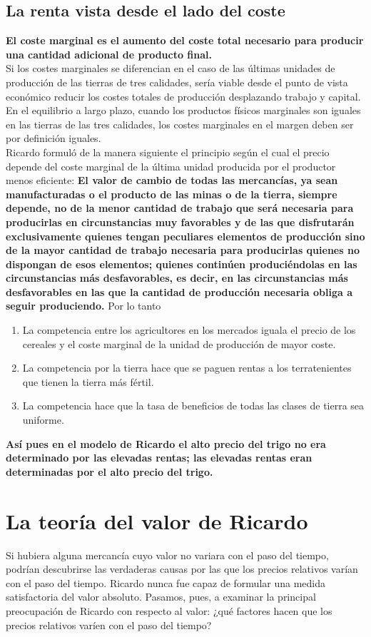 \documentclass[10pt]{book}
\begin{document}
\subsection*{La renta vista desde el lado del coste}
\textbf{El coste marginal es el aumento del coste total necesario para producir una cantidad adicional de producto final.}\\
Si los costes marginales se diferencian en el caso de las últimas unidades de producción de las tierras de tres calidades, sería viable desde el punto de vista económico reducir los costes totales de producción desplazando trabajo y capital. En el equilibrio a largo plazo, cuando los productos físicos marginales son iguales en las tierras de las tres calidades, los costes marginales en el margen deben ser por definición iguales.\\
Ricardo formuló de la manera siguiente el principio según el cual el precio depende del coste marginal de la última unidad producida por el productor menos eficiente:
\textbf{El valor de cambio de todas las mercancías, ya sean manufacturadas o el producto de las minas o de la tierra, siempre depende, no de la menor cantidad de trabajo que será necesaria para producirlas en circunstancias muy favorables y de las que disfrutarán exclusivamente quienes tengan peculiares elementos de producción sino de la mayor cantidad de trabajo necesaria para producirlas quienes no dispongan de esos elementos; quienes continúen produciéndolas en las circunstancias más desfavorables, es decir, en las circunstancias más desfavorables en las que la cantidad de producción necesaria obliga a seguir produciendo.}
Por lo tanto 
\begin{enumerate}
    \item La competencia entre los agricultores en los mercados iguala el precio de los cereales y el coste marginal de la unidad de producción de mayor coste.
    \item La competencia por la tierra hace que se paguen rentas a los terratenientes que tienen la tierra más fértil.
    \item La competencia hace que la tasa de beneficios de todas las clases de tierra sea uniforme.
\end{enumerate}

\textbf{Así pues en el modelo de Ricardo el alto precio del trigo no era determinado por las elevadas rentas; las elevadas rentas eran determinadas por el alto precio del trigo.}\\

\section*{La teoría del valor de Ricardo}
Si hubiera alguna mercancía cuyo valor no variara con el paso del tiempo, podrían descubrirse las verdaderas causas por las que los precios relativos varían con el paso del tiempo. Ricardo nunca
  fue capaz de formular una medida satisfactoria del valor absoluto. Pasamos, pues, a examinar la principal preocupación de Ricardo con respecto al valor: ¿qué factores hacen que los precios relativos varíen con el paso del tiempo?
\end{document}

